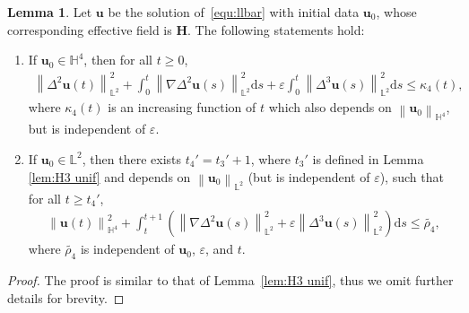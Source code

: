 \documentclass[11pt, reqno]{amsart}
\theoremstyle{definition}
\newtheorem{lemma}[theorem]{Lemma}
\numberwithin{equation}{section}
\newcommand{\bff}{\boldsymbol}
\newcommand{\bb}{\mathbb}
\newcommand{\ds}{\mathrm{d}s}
\newcommand{\norm}[2]{\left\|{#1}\right\|_{#2}}
\begin{document}
\begin{lemma}\label{lem:H4 unif}
Let $\bff{u}$ be the solution of~\eqref{equ:llbar} with initial data $\bff{u}_0$, whose corresponding effective field is $\bff{H}$. The following statements hold:
\begin{enumerate}
\item If $\bff{u}_0\in \bb{H}^4$, then for all $t\geq 0$,
\begin{align}\label{equ:et3 H4}
    \norm{\Delta^2 \bff{u}(t)}{\bb{L}^2}^2
    +
    \int_0^t \norm{\nabla \Delta^2 \bff{u}(s)}{\bb{L}^2}^2 \ds 
    +
    \varepsilon \int_0^t \norm{\Delta^3 \bff{u}(s)}{\bb{L}^2}^2 \ds 
    \leq
    \kappa_4(t),
\end{align}
where $\kappa_4(t)$ is an increasing function of $t$ which also depends on $\norm{\bff{u}_0}{\bb{H}^4}$, but is independent of $\varepsilon$.
\item If $\bff{u}_0\in\bb{L}^2$, then there exists $t_4'=t_3'+1$, where $t_3'$ is defined in Lemma \ref{lem:H3 unif} and depends on $\norm{\bff{u}_0}{\bb{L}^2}$ (but is independent of $\varepsilon$), such that for all $t\geq t_4'$,
\begin{align}\label{equ:tt1 H4}
    \norm{\bff{u}(t)}{\bb{H}^4}^2 
    +
    \int_t^{t+1} \left( \norm{\nabla \Delta^2 \bff{u}(s)}{\bb{L}^2}^2 + \varepsilon \norm{\Delta^3 \bff{u}(s)}{\bb{L}^2}^2 \right) \ds
    \leq
    \widetilde{\rho_4},
\end{align}
where $\widetilde{\rho_4}$ is independent of $\bff{u}_0$, $\varepsilon$, and $t$.
\end{enumerate}
\end{lemma}

\begin{proof}
The proof is similar to that of Lemma~\ref{lem:H3 unif}, thus we omit further details for brevity.
\end{proof}
\end{document}
